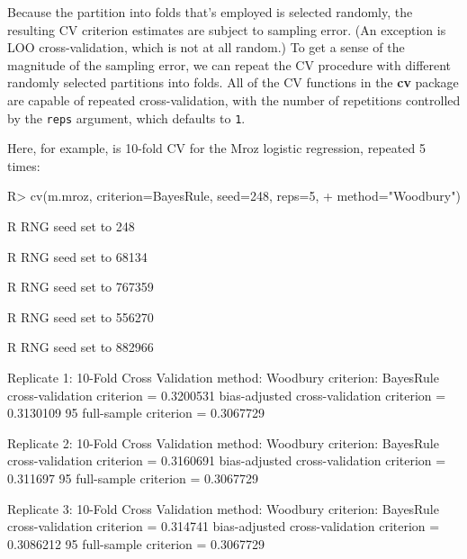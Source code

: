 \documentclass[
]{jss}
\begin{document}
Because the partition into folds that's employed is selected randomly,
the resulting CV criterion estimates are subject to sampling error. (An
exception is LOO cross-validation, which is not at all random.) To get a
sense of the magnitude of the sampling error, we can repeat the CV
procedure with different randomly selected partitions into folds. All of
the CV functions in the \textbf{cv} package are capable of repeated
cross-validation, with the number of repetitions controlled by the
\texttt{reps} argument, which defaults to \texttt{1}.

Here, for example, is 10-fold CV for the Mroz logistic regression,
repeated 5 times:

\begin{CodeChunk}
\begin{CodeInput}
R> cv(m.mroz, criterion=BayesRule, seed=248, reps=5, 
+    method="Woodbury")
\end{CodeInput}
\begin{CodeOutput}
R RNG seed set to 248
\end{CodeOutput}
\begin{CodeOutput}
R RNG seed set to 68134
\end{CodeOutput}
\begin{CodeOutput}
R RNG seed set to 767359
\end{CodeOutput}
\begin{CodeOutput}
R RNG seed set to 556270
\end{CodeOutput}
\begin{CodeOutput}
R RNG seed set to 882966
\end{CodeOutput}
\begin{CodeOutput}

Replicate 1:
10-Fold Cross Validation
method: Woodbury
criterion: BayesRule
cross-validation criterion = 0.3200531
bias-adjusted cross-validation criterion = 0.3130109
95%
full-sample criterion = 0.3067729 

Replicate 2:
10-Fold Cross Validation
method: Woodbury
criterion: BayesRule
cross-validation criterion = 0.3160691
bias-adjusted cross-validation criterion = 0.311697
95%
full-sample criterion = 0.3067729 

Replicate 3:
10-Fold Cross Validation
method: Woodbury
criterion: BayesRule
cross-validation criterion = 0.314741
bias-adjusted cross-validation criterion = 0.3086212
95%
full-sample criterion = 0.3067729 


\end{CodeOutput}
\end{CodeChunk}
\end{document}
